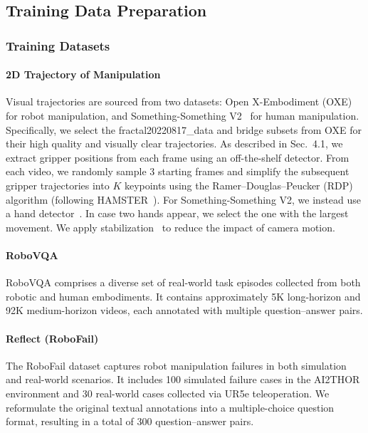 \subsection{Training Data Preparation}

\subsubsection{Training Datasets}
\paragraph{2D Trajectory of Manipulation} Visual trajectories are sourced from two datasets: Open X-Embodiment (OXE)~\cite{o2024open} for robot manipulation, and Something-Something V2~\cite{goyal2017something} for human manipulation. Specifically, we select the fractal20220817\_data and bridge subsets from OXE for their high quality and visually clear trajectories. As described in Sec.~4.1, we extract gripper positions from each frame using an off-the-shelf detector\cite{niu2024llarva}. From each video, we randomly sample 3 starting frames and simplify the subsequent gripper trajectories into $K$ keypoints using the Ramer–Douglas–Peucker (RDP) algorithm (following HAMSTER~\cite{li2025hamster}). For Something-Something V2, we instead use a hand detector~\cite{Shan20}. In case two hands appear, we select the one with the largest movement. We apply stabilization~\cite{yang2025magma} to reduce the impact of camera motion.

\paragraph{RoboVQA~\cite{sermanet2024robovqa}} RoboVQA comprises a diverse set of real-world task episodes collected from both robotic and human embodiments. It contains approximately 5K long-horizon and 92K medium-horizon videos, each annotated with multiple question–answer pairs.

\paragraph{Reflect (RoboFail)~\cite{liu2023reflect}} The RoboFail dataset captures robot manipulation failures in both simulation and real-world scenarios. It includes 100 simulated failure cases in the AI2THOR environment and 30 real-world cases collected via UR5e teleoperation. We reformulate the original textual annotations into a multiple-choice question format, resulting in a total of 300 question–answer pairs.

